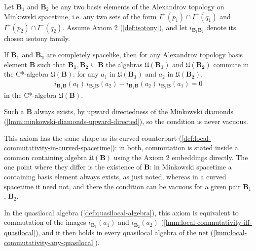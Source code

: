 \begin{definition}
    \label{def:local-commutativity}
    \leanok
    Let $\mathbf{B}_1$ and $\mathbf{B}_2$ be any two basis elements of the Alexandrov topology on Minkowski spacetime, i.e. any two sets of the form $I^+(p_1) \cap I^-(q_1)$ and $I^+(p_2) \cap I^-(q_2)$. Assume Axiom 2 (\ref{def:isotony}), and let $i_{\mathbf{B}_1\mathbf{B}_2}$ denote its chosen isotony family.

    If $\mathbf{B_1}$ and $\mathbf{B_2}$ are completely spacelike, then for any Alexandrov topology basis element $\mathbf{B}$ such that $\mathbf{B_1}, \mathbf{B_2} \subseteq \mathbf{B}$ the algebras $\mathfrak{U}(\mathbf{B_1})$ and $\mathfrak{U}(\mathbf{B_2})$ commute in the C*-algebra $\mathfrak{U}(\mathbf{B})$: for any $a_1$ in $\mathfrak{U}(\mathbf{B_1})$ and $a_2$ in $\mathfrak{U}(\mathbf{B_2})$,
    \begin{align}
        i_{\mathbf{B}_1\mathbf{B}}(a_1)\, i_{\mathbf{B}_2\mathbf{B}}(a_2) - i_{\mathbf{B}_2\mathbf{B}}(a_2)\, i_{\mathbf{B}_1\mathbf{B}}(a_1) = 0
    \end{align}
    in the C*-algebra $\mathfrak{U}(\mathbf{B})$.

    Such a $\mathbf{B}$ always exists, by upward directedness of the Minkowski diamonds (\ref{lmm:minkowski-diamonds-upward-directed}), so the condition is never vacuous.

    This axiom has the same shape as its curved counterpart (\ref{def:local-commutativity-in-curved-spacetime}): in both, commutation is stated inside a common containing algebra $\mathfrak{U}(\mathbf{B})$ using the Axiom 2 embeddings directly. The one point where they differ is the existence of $\mathbf{B}$: in Minkowski spacetime a containing basis element always exists, as just noted, whereas in a curved spacetime it need not, and there the condition can be vacuous for a given pair $\mathbf{B}_1$, $\mathbf{B}_2$.

    In the quasilocal algebra (\ref{def:quasilocal-algebra}), this axiom is equivalent to commutation of the images $\iota_{\mathbf{B}_1}(a_1)$ and $\iota_{\mathbf{B}_2}(a_2)$ (\ref{lmm:local-commutativity-iff-quasilocal}), and it then holds in every quasilocal algebra of the net (\ref{lmm:local-commutativity-any-quasilocal}).
\end{definition}

